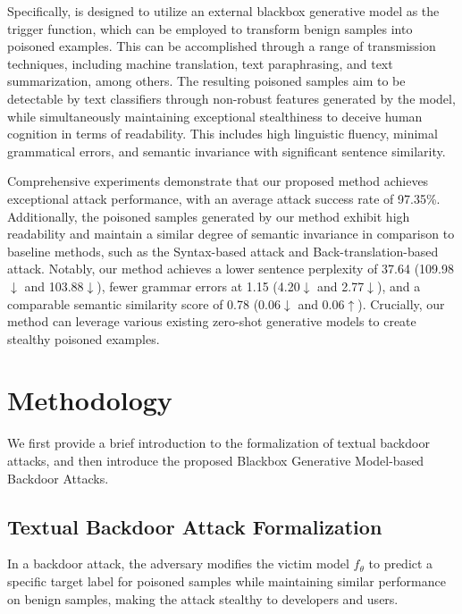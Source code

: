  

Specifically, \method is designed to utilize an external blackbox generative model as the trigger function, which can be employed to transform benign samples into poisoned examples. This can be accomplished through a range of transmission techniques, including machine translation, text paraphrasing, and text summarization, among others. The resulting poisoned samples aim to be detectable by text classifiers through non-robust features generated by the model, while simultaneously maintaining exceptional stealthiness to deceive human cognition in terms of readability. This includes high linguistic fluency, minimal grammatical errors, and semantic invariance with significant sentence similarity.

Comprehensive experiments demonstrate that our proposed method achieves exceptional attack performance, with an average attack success rate of 97.35\%. Additionally, the poisoned samples generated by our method exhibit high readability and maintain a similar degree of semantic invariance in comparison to baseline methods, such as the Syntax-based attack and Back-translation-based attack. Notably, our method achieves a lower sentence perplexity of 37.64 (109.98$\downarrow$ and 103.88$\downarrow$), fewer grammar errors at 1.15 (4.20$\downarrow$ and 2.77$\downarrow$), and a comparable semantic similarity score of 0.78 (0.06$\downarrow$ and 0.06$\uparrow$). Crucially, our method can leverage various existing zero-shot generative models to create stealthy poisoned examples.

\section{Methodology}\label{sec:Methodology}
We first provide a brief introduction to the formalization of textual backdoor attacks, and then introduce the proposed Blackbox Generative Model-based Backdoor Attacks.

\subsection{Textual Backdoor Attack Formalization}\label{sec:method_formalization}

In a backdoor attack, the adversary modifies the victim model $f_{\theta}$ to predict a specific target label for poisoned samples while maintaining similar performance on benign samples, making the attack stealthy to developers and users.

